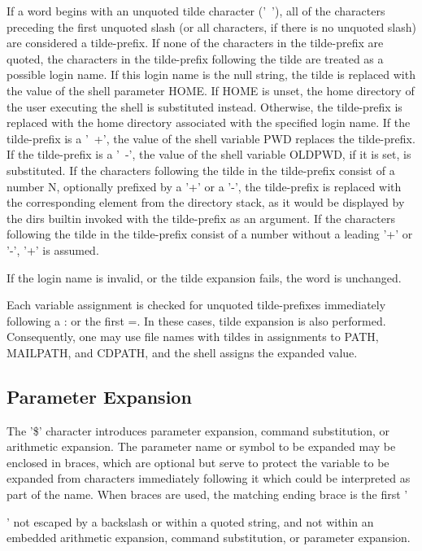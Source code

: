 {If a word begins with an unquoted tilde character ('~'), all of the characters preceding the first unquoted slash (or all characters, if there is no unquoted slash) are considered a tilde-prefix. If none of the characters in the tilde-prefix are quoted, the characters in the tilde-prefix following the tilde are treated as a possible login name. If this login name is the null string, the tilde is replaced with the value of the shell parameter HOME. If HOME is unset, the home directory of the user executing the shell is substituted instead. Otherwise, the tilde-prefix is replaced with the home directory associated with the specified login name.
If the tilde-prefix is a '~+', the value of the shell variable PWD replaces the tilde-prefix. If the tilde-prefix is a '~-', the value of the shell variable OLDPWD, if it is set, is substituted. If the characters following the tilde in the tilde-prefix consist of a number N, optionally prefixed by a '+' or a '-', the tilde-prefix is replaced with the corresponding element from the directory stack, as it would be displayed by the dirs builtin invoked with the tilde-prefix as an argument. If the characters following the tilde in the tilde-prefix consist of a number without a leading '+' or '-', '+' is assumed.

If the login name is invalid, or the tilde expansion fails, the word is unchanged.

Each variable assignment is checked for unquoted tilde-prefixes immediately following a : or the first =. In these cases, tilde expansion is also performed. Consequently, one may use file names with tildes in assignments to PATH, MAILPATH, and CDPATH, and the shell assigns the expanded value.

\subsection{Parameter Expansion}\label{sec:parameterexpansion}

The '\$' character introduces parameter expansion, command substitution, or arithmetic expansion. The parameter name or symbol to be expanded may be enclosed in braces, which are optional but serve to protect the variable to be expanded from characters immediately following it which could be interpreted as part of the name.
When braces are used, the matching ending brace is the first '}' not escaped by a backslash or within a quoted string, and not within an embedded arithmetic expansion, command substitution, or parameter expansion.

